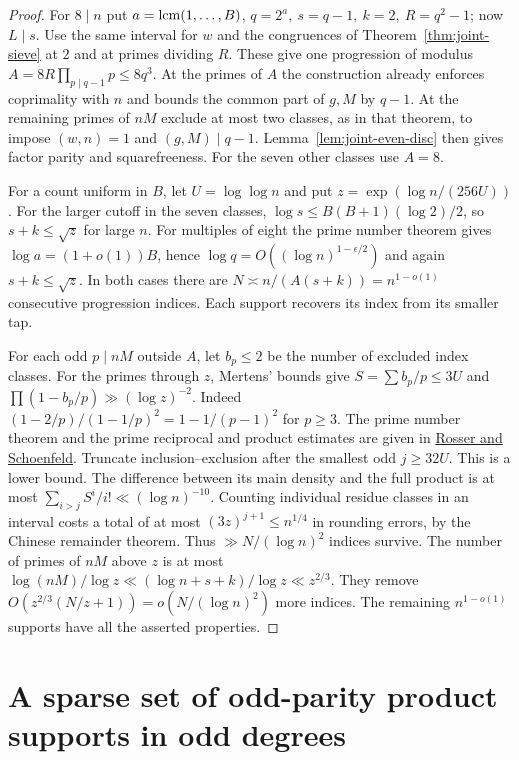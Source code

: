 \documentclass[11pt]{article}
\begin{document}
\begin{proof}
For \(8\mid n\) put \(a=\mathop{\rm lcm}(1,\ldots,B)\),
\(q=2^a,\ s=q-1,\ k=2,\ R=q^2-1\); now \(L\mid s\).
Use the same interval for \(w\) and the congruences of
Theorem~\ref{thm:joint-sieve} at \(2\) and at primes dividing \(R\).
These give one progression of modulus
\(A=8R\prod_{p\mid q-1}p\le8q^3\). At the primes of \(A\) the
construction already enforces coprimality with \(n\) and bounds the
common part of \(g,M\) by \(q-1\). At the remaining primes of \(nM\)
exclude at most two classes, as in that theorem, to impose
\((w,n)=1\) and \((g,M)\mid q-1\). Lemma~\ref{lem:joint-even-disc}
then gives factor parity and squarefreeness. For the seven other
classes use \(A=8\).

For a count uniform in \(B\), let \(U=\log\log n\)
and put \(z=\exp(\log n/(256U))\).
For the larger cutoff in the seven classes,
\(\log s\le B(B+1)(\log2)/2\), so \(s+k\le\sqrt z\) for large \(n\).
For multiples of eight the prime number theorem gives
\(\log a=(1+o(1))B\), hence \(\log q=O((\log n)^{1-\epsilon/2})\)
and again \(s+k\le\sqrt z\). In both cases there are
\(N\asymp n/(A(s+k))=n^{1-o(1)}\) consecutive progression indices.
Each support recovers its index from its smaller tap.

For each odd \(p\mid nM\) outside \(A\), let \(b_p\le2\) be the
number of excluded index classes. For the primes through \(z\),
Mertens' bounds give \(S=\sum b_p/p\le3U\) and
\(\prod(1-b_p/p)\gg(\log z)^{-2}\).
Indeed \((1-2/p)/(1-1/p)^2=1-1/(p-1)^2\) for \(p\ge3\).
The prime number theorem and the prime reciprocal and product estimates
are given in \href{https://doi.org/10.1215/ijm/1255631807}{Rosser and Schoenfeld}.
Truncate inclusion--exclusion after the smallest odd \(j\ge32U\).
This is a lower bound. The difference between its main density
and the full product is at most
\(\sum_{i>j}S^i/i!\ll(\log n)^{-10}\).
Counting individual residue classes in an interval costs a total of
at most \((3z)^{j+1}\le n^{1/4}\) in rounding errors, by the
Chinese remainder theorem. Thus \(\gg N/(\log n)^2\) indices survive.
The number of primes of \(nM\) above \(z\) is at most
\(\log(nM)/\log z\ll(\log n+s+k)/\log z\ll z^{2/3}\).
They remove \(O(z^{2/3}(N/z+1))=o(N/(\log n)^2)\) more indices.
The remaining \(n^{1-o(1)}\) supports have all the asserted properties.
\end{proof}

\section{A sparse set of odd-parity product supports in odd degrees}\label{sec:product-parity-sector}
\end{document}
